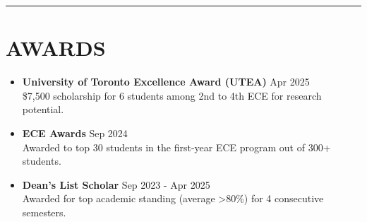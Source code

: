 \documentclass[letterpaper,10pt]{article}
\begin{document}
\noindent\rule{\linewidth}{1pt}

\section*{\textbf{AWARDS}}

\begin{itemize}[leftmargin=0.2in]
	\item \textbf{University of Toronto Excellence Award (UTEA)} \hfill Apr 2025\\
    \$7,500 scholarship for 6 students among 2nd to 4th ECE for research potential.
	\item \textbf{ECE Awards} \hfill Sep 2024\\
	Awarded to top 30 students in the first-year ECE program out of 300+ students.
	\item \textbf{Dean's List Scholar} \hfill Sep 2023 - Apr 2025\\
    Awarded for top academic standing (average \textgreater 80\%) for 4 consecutive semesters.
\end{itemize}
\end{document}
